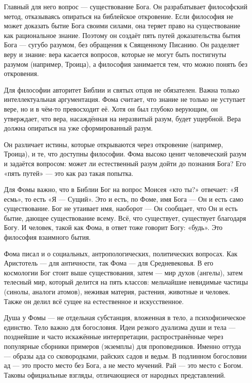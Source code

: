 Главный для него вопрос --- существование Бога. Он разрабатывает философский метод, отказываясь опираться на библейское откровение. Если философия не может доказать бытие Бога своими силами, она теряет право на существование как рациональное знание. Поэтому он создаёт пять путей доказательства бытия Бога --- сугубо разумом, без обращения к Священному Писанию. Он разделяет веру и знание: вера касается вопросов, которые не могут быть постигнуты разумом (например, Троица), а философия занимается тем, что можно понять без откровения.

Для философии авторитет Библии и святых отцов не обязателен. Важна только интеллектуальная аргументация. Фома считает, что знание не только не уступает вере, но и в чём-то превосходит её. Хотя он был глубоко верующим, он утверждает, что вера, насаждённая на неразвитый разум, будет ущербной. Вера должна опираться на уже сформированный разум.

Он различает истины, которые открываются через откровение (например, Троица), и те, что доступны философии. Фома высоко ценит человеческий разум и задаётся вопросом: может ли естественный разум дойти до познания Бога? Его «пять путей» --- это как раз такая попытка.

Для Фомы важно, что в Библии Бог на вопрос Моисея «кто ты?» отвечает: «Я есмь», то есть «Я --- Сущий». Это и есть, по Фоме, имя Бога --- Он и есть само существование. Бог не утаивает имя, наоборот --- Он сообщает, что Он и есть бытие, дающее существование всему. Всё, что существует, существует благодаря Богу. И человек, такой как Фома, в ответ тоже говорит Богу: «будь». Это философия взаимного бытия.

Фома писал и о социальных, антропологических, политических вопросах. Как Аристотель --- для античности, так Фома --- для Средневековья. В его космологии Бог стоит выше существования, затем --- мир духов (ангелы), затем телесный мир, который делится на пять классов: мельчайшие невидимые частицы (синолы, аналоги атомов), неживая материя, растения, животные и человек. Также он делил всё сущее на естественное и искусственное.

Душа у Фомы --- не отдельная субстанция, вложенная в тело, а психофизическое единство. Тело важно для богословия. Идеи резкого дуализма души и тела --- позднейшие и часто искажённые интерпретации, распространённые через популярные сборники примеров (экземплы) для проповедников. Именно оттуда --- образы ада со сковородками, райских садов и ведьм. В подлинном богословии ад --- это просто место без Бога, а не место мучений. Рай --- это место с Богом. Таковы официальные взгляды, отличающиеся от народных представлений.


